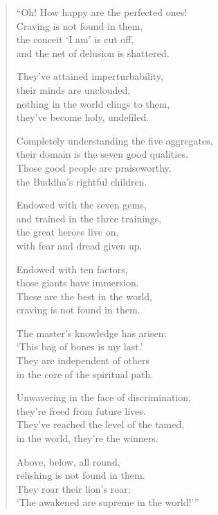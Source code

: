 \documentclass[12pt,openany]{book}%
\begin{document}
\begin{verse}%
“Oh! How happy are the perfected ones! \\
Craving is not found in them, \\
the conceit ‘I am’ is cut off, \\
and the net of delusion is shattered. 

They’ve attained imperturbability, \\
their minds are unclouded, \\
nothing in the world clings to them, \\
they’ve become holy, undefiled. 

Completely understanding the five aggregates, \\
their domain is the seven good qualities. \\
Those good people are praiseworthy, \\
the Buddha’s rightful children. 

Endowed with the seven gems, \\
and trained in the three trainings, \\
the great heroes live on, \\
with fear and dread given up. 

Endowed with ten factors, \\
those giants have immersion. \\
These are the best in the world, \\
craving is not found in them. 

The master’s knowledge has arisen: \\
‘This bag of bones is my last.’ \\
They are independent of others \\
in the core of the spiritual path. 

Unwavering in the face of discrimination, \\
they’re freed from future lives. \\
They’ve reached the level of the tamed, \\
in the world, they’re the winners. 

Above, below, all round, \\
relishing is not found in them. \\
They roar their lion’s roar: \\
‘The awakened are supreme in the world!’” 

%
\end{verse}
\end{document}
